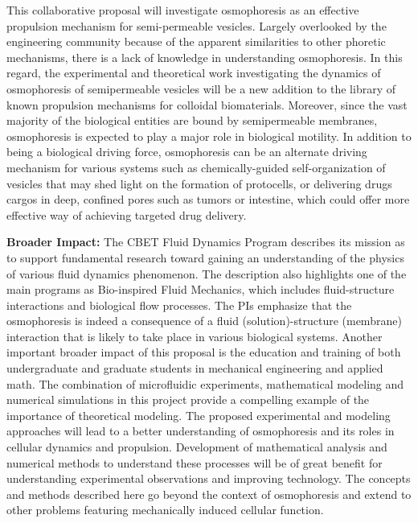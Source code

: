 \documentclass[11pt]{article}
\begin{document}
This collaborative proposal will investigate osmophoresis as an
effective propulsion mechanism for semi-permeable vesicles.  Largely
overlooked by the engineering community because of the apparent
similarities to other phoretic mechanisms, there is a lack of knowledge
in understanding osmophoresis.  In this regard, the experimental and
theoretical work investigating the dynamics of osmophoresis of
semipermeable vesicles will be a new addition to the library of known
propulsion mechanisms for colloidal biomaterials.  Moreover, since the
vast majority of the biological entities are bound by semipermeable
membranes, osmophoresis is expected to play a major role in biological
motility.  In addition to being a biological driving force, osmophoresis
can be an alternate driving mechanism for various systems such as
chemically-guided self-organization of vesicles that may shed light on
the formation of protocells, or delivering drugs cargos in deep,
confined pores such as tumors or intestine, which could offer more
effective way of achieving targeted drug delivery.

\noindent
{\bf Broader Impact:} 
The CBET Fluid Dynamics Program describes its mission as to support
fundamental research toward gaining an understanding of the physics of
various fluid dynamics phenomenon. The description also highlights one
of the main programs as Bio-inspired Fluid Mechanics, which includes
fluid-structure interactions and biological flow processes. The PIs
emphasize that the osmophoresis is indeed a consequence of a fluid
(solution)-structure (membrane) interaction that is likely to take place
in various biological systems.  Another important broader impact of this
proposal is the education and training of both undergraduate and
graduate students in mechanical engineering and applied math.  The
combination of microfluidic experiments, mathematical modeling and
numerical simulations in this project provide a compelling example of
the importance of theoretical modeling. The proposed experimental and
modeling approaches will lead to a better understanding of osmophoresis
and its roles in cellular dynamics and propulsion.  Development of
mathematical analysis and numerical methods to understand these
processes will be of great benefit for understanding experimental
observations and improving technology.  The concepts and methods
described here go beyond the context of osmophoresis and extend to other
problems featuring mechanically induced cellular function.

\end{document}
